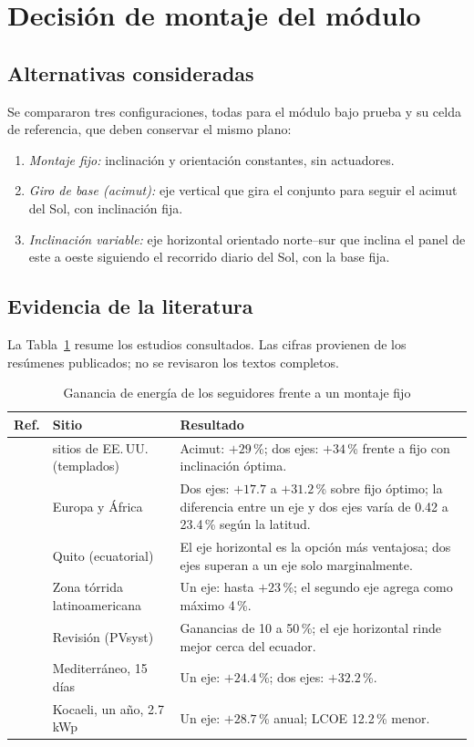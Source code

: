 \documentclass[10pt,letterpaper,twocolumn]{article}
\begin{document}
\section{Decisión de montaje del módulo}
\subsection{Alternativas consideradas}
Se compararon tres configuraciones, todas para el módulo bajo prueba y su celda de referencia, que deben conservar el mismo plano:
\begin{enumerate}[label=\arabic*)]
\item \emph{Montaje fijo:} inclinación y orientación constantes, sin actuadores.
\item \emph{Giro de base (acimut):} eje vertical que gira el conjunto para seguir el acimut del Sol, con inclinación fija.
\item \emph{Inclinación variable:} eje horizontal orientado norte--sur que inclina el panel de este a oeste siguiendo el recorrido diario del Sol, con la base fija.
\end{enumerate}

\subsection{Evidencia de la literatura}
La Tabla~\ref{tab:lit} resume los estudios consultados. Las cifras provienen de los resúmenes publicados; no se revisaron los textos completos.

\begin{table}[t]
\centering
\caption{Ganancia de energía de los seguidores frente a un montaje fijo}
\label{tab:lit}
\footnotesize
\begin{tabularx}{\columnwidth}{@{}>{\raggedright\arraybackslash}p{0.8cm}>{\raggedright\arraybackslash}p{2.1cm}>{\raggedright\arraybackslash}X@{}}
\toprule
Ref. & Sitio & Resultado\\
\midrule
\cite{lubitz} & 217 sitios de EE.\,UU. (templados) & Acimut: $+29$\,\%; dos ejes: $+34$\,\% frente a fijo con inclinación óptima.\\
\cite{bahrami} & Europa y África & Dos ejes: $+17.7$ a $+31.2$\,\% sobre fijo óptimo; la diferencia entre un eje y dos ejes varía de 0.42 a 23.4\,\% según la latitud.\\
\cite{ordonez} & Quito (ecuatorial) & El eje horizontal es la opción más ventajosa; dos ejes superan a un eje solo marginalmente.\\
\cite{serrano} & Zona tórrida latinoamericana & Un eje: hasta $+23$\,\%; el segundo eje agrega como máximo 4\,\%.\\
\cite{mermoud} & Revisión (PVsyst) & Ganancias de 10 a 50\,\%; el eje horizontal rinde mejor cerca del ecuador.\\
\cite{demirdelen} & Mediterráneo, 15 días & Un eje: $+24.4$\,\%; dos ejes: $+32.2$\,\%.\\
\cite{kibar} & Kocaeli, un año, 2.7 kWp & Un eje: $+28.7$\,\% anual; LCOE 12.2\,\% menor.\\
\bottomrule
\end{tabularx}
\end{table}
\end{document}
